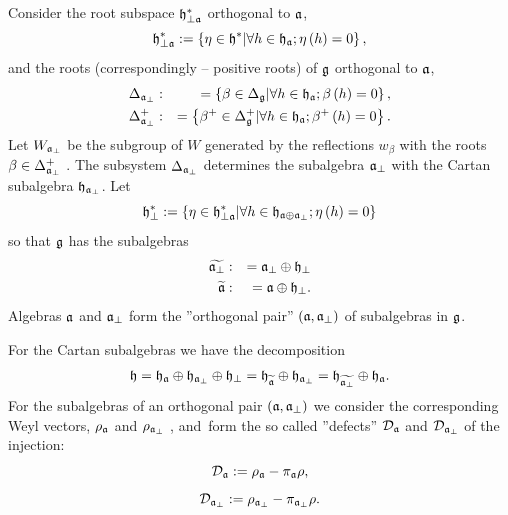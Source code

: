 \documentclass[12pt]{article}
\theoremstyle{definition}
\begin{document}
Consider the root subspace $\frak{h}_{\perp \frak{a}}^{\ast }$ orthogonal to 
$\frak{a}$, 
\[
\frak{h}_{\perp \frak{a}}^{\ast }:=\left\{ \eta \in \frak{h}^{\ast }|\forall
h\in \frak{h}_{\frak{a}};\eta \left( h\right) =0\right\} , 
\]
and the roots (correspondingly -- positive roots) of $\frak{g}$ orthogonal
to $\frak{a}$, 
\begin{eqnarray*}
\Delta _{\frak{a}_{\perp }} &:&=\left\{ \beta \in \Delta _{\frak{g}}|\forall
h\in \frak{h}_{\frak{a}};\beta \left( h\right) =0\right\} , \\
\Delta _{\frak{a}_{\perp }}^{+} &:&=\left\{ \beta ^{+}\in \Delta _{\frak{g}%
}^{+}|\forall h\in \frak{h}_{\frak{a}};\beta ^{+}\left( h\right) =0\right\} .
\end{eqnarray*}
Let $W_{\frak{a}_{\perp }}$ be the subgroup of $W$ generated by the
reflections $w_{\beta }$ with the roots $\beta \in \Delta _{\frak{a}_{\perp
}}^{+}$ . The subsystem $\Delta _{\frak{a}_{\perp }}$ determines the
subalgebra $\frak{a}_{\perp }$ with the Cartan subalgebra $\frak{h}_{\frak{a}%
_{\perp }}$. Let 
\[
\frak{h}_{\perp }^{\ast }:=\left\{ \eta \in \frak{h}_{\perp \frak{a}}^{\ast
}|\forall h\in \frak{h}_{\frak{a}\oplus \frak{a}_{\perp }};\eta \left(
h\right) =0\right\} 
\]
so that $\frak{g}$ has the subalgebras 
\begin{eqnarray*}
\widetilde{\frak{a}_{\perp }} &:&=\frak{a}_{\perp }\oplus \frak{h}_{\perp }
\\
\widetilde{\frak{a}} &:&=\frak{a}\oplus \frak{h}_{\perp }.
\end{eqnarray*}
Algebras $\frak{a}$ and $\frak{a}_{\perp }$ form the ''orthogonal pair'' $%
\left( \frak{a},\frak{a}_{\perp }\right) $ of subalgebras in $\frak{g}$.

For the Cartan subalgebras we have the decomposition 
\begin{equation}
\frak{h}=\frak{\frak{h}_{\frak{a}}}\oplus \frak{h}_{\frak{a}_{\perp }}\oplus 
\frak{h}_{\perp }=\frak{\frak{h}_{\widetilde{\frak{a}}}}\oplus \frak{h}_{%
\frak{a}_{\perp }}=\frak{\frak{h}_{\widetilde{\frak{a}_{\perp }}}}\oplus 
\frak{h}_{\frak{a}}.
\end{equation}
For the subalgebras of an orthogonal pair $\left( \frak{a},\frak{a}_{\perp
}\right) $ we consider the corresponding Weyl vectors, $\rho _{\frak{a}}$
and $\rho _{\frak{a}_{\perp }}$ , and\ form the so called ''defects'' $%
\mathcal{D}_{\frak{a}}$ and $\mathcal{D}_{\frak{a}_{\perp }}$ of the
injection: 
\begin{equation}
\mathcal{D}_{\frak{a}}:=\rho _{\frak{a}}-\pi _{\frak{a}}\rho ,
\end{equation}
\begin{equation}
\mathcal{D}_{\frak{a}_{\perp }}:=\rho _{\frak{a}_{\perp }}-\pi _{\frak{a}%
_{\perp }}\rho .
\end{equation}
\end{document}
